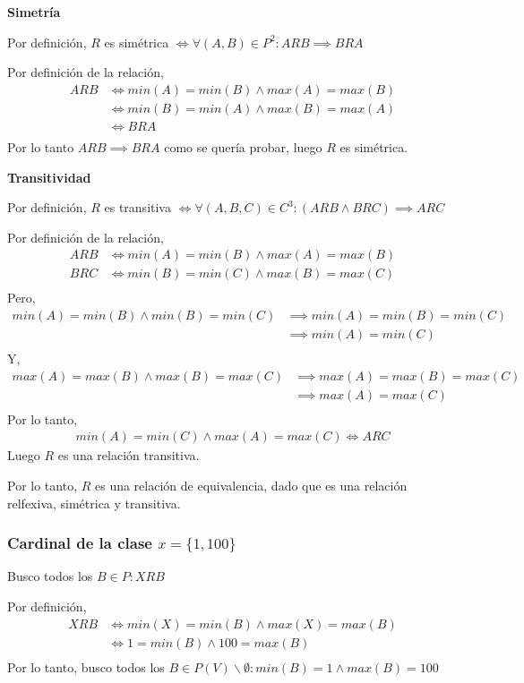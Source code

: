 \textbf{Simetría}

Por definición, $R$ es simétrica $ \iff \forall (A,B) \in P^2: ARB \implies BRA $

Por definición de la relación,
\begin{align*}
    ARB &\iff min(A) = min(B) \wedge max(A) = max(B) \\
    &\iff min(B) = min(A) \wedge max(B) = max(A) \\
    &\iff BRA \\
\end{align*}
Por lo tanto $ ARB \implies BRA $ como se quería probar, luego $R$ es simétrica.

\textbf{Transitividad}

Por definición, $R$ es transitiva $ \iff \forall (A,B,C) \in C^3: (ARB \wedge BRC) \implies ARC $

Por definición de la relación,
\begin{align*}
    ARB &\iff min(A) = min(B) \wedge max(A) = max(B) \\
    BRC &\iff min(B) = min(C) \wedge max(B) = max(C) \\
\end{align*}
Pero,
\begin{align*}
    min(A) = min(B) \wedge min(B) = min(C) &\implies min(A) = min(B) = min(C) \\
    &\implies min(A) = min(C) \\
\end{align*}
Y,
\begin{align*}
    max(A) = max(B) \wedge max(B) = max(C) &\implies max(A) = max(B) = max(C) \\
    &\implies max(A) = max(C) \\
\end{align*}
Por lo tanto,
\begin{align*}
    min(A) = min(C) \wedge max(A) = max(C) \iff ARC
\end{align*}
Luego $R$ es una relación transitiva.

Por lo tanto, $R$ es una relación de equivalencia, dado que es una relación relfexiva, simétrica y transitiva.

\subsubsection{Cardinal de la clase $ x =\{ 1,100 \} $}

Busco todos los $ B \in P: XRB $

Por definición, 
\begin{align*}
    XRB &\iff min(X) = min(B) \wedge max(X) = max(B) \\
    &\iff 1 = min(B) \wedge 100 = max(B) \\
\end{align*}
Por lo tanto, busco todos los $B \in P(V) \backslash \emptyset: min(B) = 1 \wedge max(B) = 100 $ 

